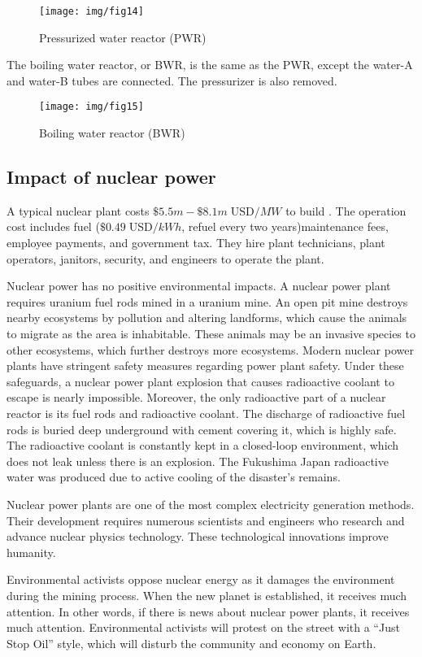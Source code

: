 \documentclass{article}
\begin{document}
\begin{figure}[htbp]
    \center
    \texttt{[image: img/fig14]}
    \caption{Pressurized water reactor (PWR)}
\end{figure}
The boiling water reactor, or BWR, is the same as the PWR, except the water-A and water-B tubes are connected. The pressurizer is also removed. 
\begin{figure}[htbp]
    \center
    \texttt{[image: img/fig15]}
    \caption{Boiling water reactor (BWR)}
\end{figure}
\subsection{Impact of nuclear power}
A typical nuclear plant costs $\$5.5m - \$8.1m \;\text{USD} / MW$ to build \cite{cite17}. The operation cost includes fuel ($\$0.49 \; \text{USD} / kWh$, refuel every two years)maintenance fees, employee payments, and government tax. They hire plant technicians, plant operators, janitors, security, and engineers to operate the plant. 
 
Nuclear power has no positive environmental impacts. A nuclear power plant requires uranium fuel rods mined in a uranium mine. An open pit mine destroys nearby ecosystems by pollution and altering landforms, which cause the animals to migrate as the area is inhabitable. These animals may be an invasive species to other ecosystems, which further destroys more ecosystems. Modern nuclear power plants have stringent safety measures regarding power plant safety. Under these safeguards, a nuclear power plant explosion that causes radioactive coolant to escape is nearly impossible. Moreover, the only radioactive part of a nuclear reactor is its fuel rods and radioactive coolant. The discharge of radioactive fuel rods is buried deep underground with cement covering it, which is highly safe. The radioactive coolant is constantly kept in a closed-loop environment, which does not leak unless there is an explosion. The Fukushima Japan radioactive water was produced due to active cooling of the disaster’s remains. 
 
Nuclear power plants are one of the most complex electricity generation methods. Their development requires numerous scientists and engineers who research and advance nuclear physics technology. These technological innovations improve humanity. 
 
Environmental activists oppose nuclear energy as it damages the environment during the mining process. When the new planet is established, it receives much attention. In other words, if there is news about nuclear power plants, it receives much attention. Environmental activists will protest on the street with a “Just Stop Oil” style, which will disturb the community and economy on Earth.
 
\end{document}
